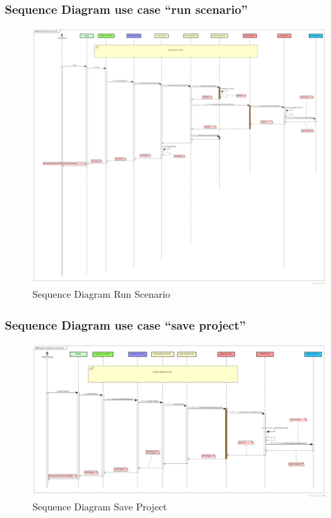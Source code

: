 	\subsubsection{Sequence Diagram use case ``run scenario''}
	\begin{figure}[h]
		\centering
		\includegraphics[width=1\textwidth]{SequenceDiagramRunScenario.png}
		\caption{Sequence Diagram Run Scenario}
	\end{figure}
	\clearpage
\newpage 
	\subsubsection{Sequence Diagram use case ``save project''}
	\begin{figure}[h]
		\centering
		\includegraphics[width=1\textwidth]{SequenceDiagramSaveProject.png}
		\caption{Sequence Diagram Save Project}
	\end{figure}

